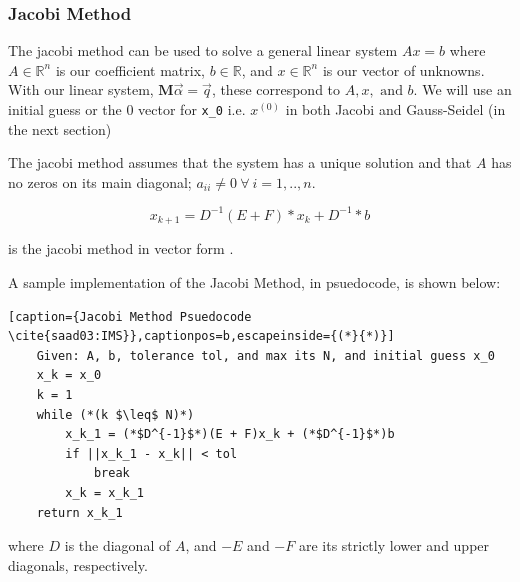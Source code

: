 \subsubsection{Jacobi Method}

The jacobi method can be used to solve a general linear system $Ax=b$ where $A \in \mathbb{R}^n$ is our coefficient matrix, $b \in \mathbb{R}$, and $x \in \mathbb{R}^n$ is our vector of unknowns. With our linear system, $\mathbf{M} \Vec{\alpha} = \Vec{q}$, these correspond to $A, x, \text{ and } b$. We will use an initial guess or the 0 vector for \texttt{x\_0} i.e. $x^{(0)}$ in both Jacobi and Gauss-Seidel (in the next section)

The jacobi method assumes that the system has a unique solution and that $A$ has no zeros on its main diagonal; $a_{ii} \neq 0 \: \forall \: i = 1, .., n$.


$$
    x_{k+1} = D^{-1}(E + F)*x_k + D^{-1}*b
$$

is the jacobi method in vector form \cite{saad03:IMS}.

A sample implementation of the Jacobi Method, in psuedocode, is shown below:

\begin{lstlisting}[caption={Jacobi Method Psuedocode \cite{saad03:IMS}},captionpos=b,escapeinside={(*}{*)}]
    Given: A, b, tolerance tol, and max its N, and initial guess x_0
    x_k = x_0
    k = 1
    while (*(k $\leq$ N)*)
        x_k_1 = (*$D^{-1}$*)(E + F)x_k + (*$D^{-1}$*)b
        if ||x_k_1 - x_k|| < tol
            break
        x_k = x_k_1
    return x_k_1
\end{lstlisting}



where $D$ is the diagonal of $A$, and $-E$ and $-F$ are its strictly lower and upper diagonals, respectively.



